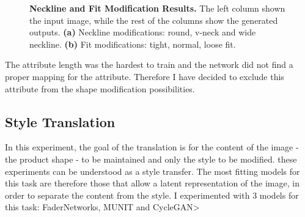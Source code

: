 \documentclass[12pt]{report}
\begin{document}
\begin{figure}[!h]
\centering
{}
\caption{\label{fig:neckline_results} \textbf{Neckline and Fit Modification Results.} The left column shown the input image, while the rest of the columns show the generated outputs. \textbf{(a)} Neckline modifications: round, v-neck and wide neckline. \textbf{(b)} Fit modifications: tight, normal, loose fit.}
\end{figure}

The attribute length was the hardest to train and the network did not find a proper mapping for the attribute. Therefore I have decided to exclude this attribute from the shape modification possibilities.

\pagebreak
\subsection{Style Translation}
In this experiment, the goal of the translation is for the content of the image - the product shape - to be maintained and only the style to be modified. these experiments can be understood as a style transfer. The most fitting models for this task are therefore those that allow a latent representation of the image, in order to separate the content from the style. I experimented with 3 models for this task: FaderNetworks, MUNIT and CycleGAN>
\end{document}
